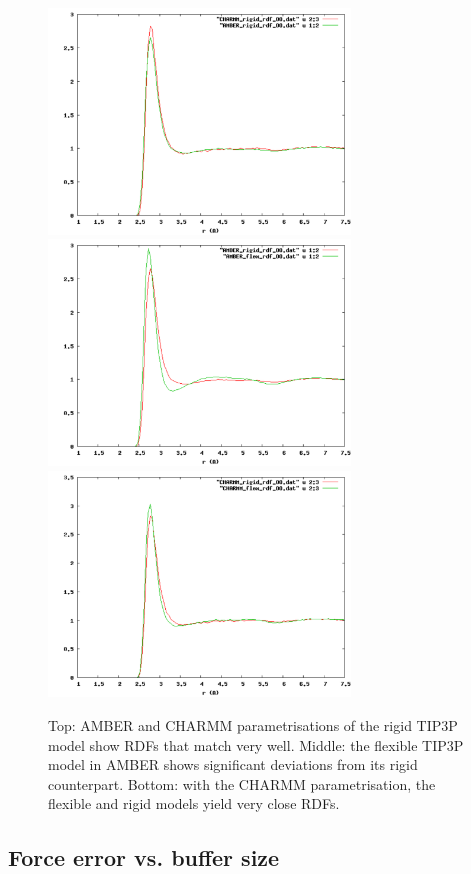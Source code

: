 \documentclass[11pt]{revtex4}
\begin{document}
\begin{figure}
\includegraphics[height=6cm]{AMBER-CHARMM_TIP3P_rdf}
\includegraphics[height=6cm]{AMBER_rigid-flex_rdf}
\includegraphics[height=6cm]{CHARMM_rigid-flex_rdf}
\caption{Top: AMBER and CHARMM parametrisations of the rigid TIP3P model show RDFs that match very well. Middle: the flexible TIP3P model in AMBER shows significant deviations from its rigid counterpart. Bottom: with the CHARMM parametrisation, the flexible and rigid models yield very close RDFs.}
\label{rigid-flex}
\end{figure}

\subsection{Force error vs. buffer size}
\end{document}
